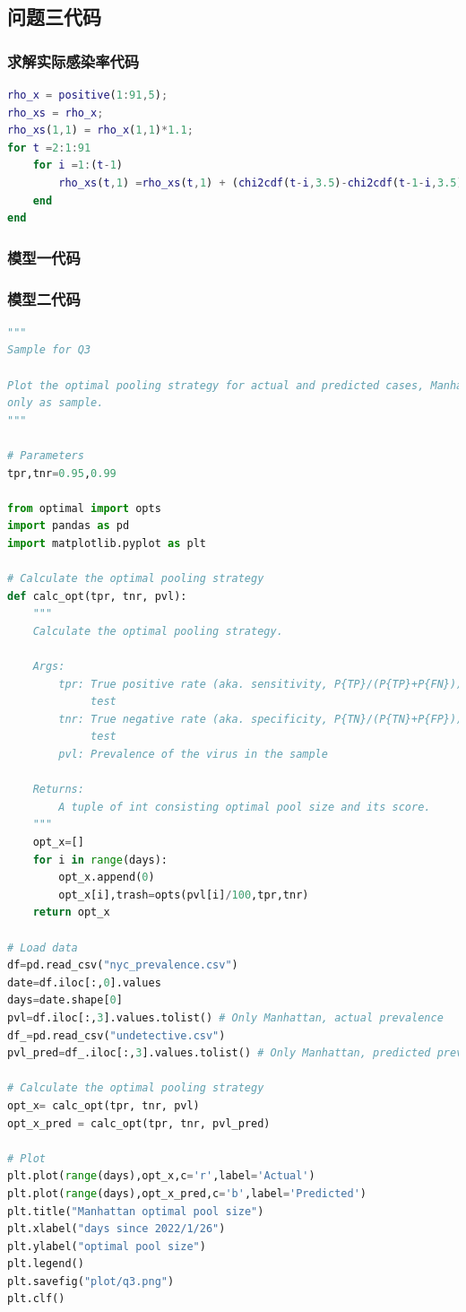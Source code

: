 \documentclass[withoutpreface,bwprint]{cumcmthesis} %
\begin{document}
\begin{appendices}
\subsection{问题三代码}
\subsubsection{求解实际感染率代码}
\begin{lstlisting}[language=matlab]
rho_x = positive(1:91,5);
rho_xs = rho_x;
rho_xs(1,1) = rho_x(1,1)*1.1;
for t =2:1:91
    for i =1:(t-1)
        rho_xs(t,1) =rho_xs(t,1) + (chi2cdf(t-i,3.5)-chi2cdf(t-1-i,3.5))*(rho_xs(i,1) - rho_x(i,1));
    end
end
\end{lstlisting}
\subsubsection{模型一代码}

\subsubsection{模型二代码}
\begin{lstlisting}[language=python]
"""
Sample for Q3

Plot the optimal pooling strategy for actual and predicted cases, Manhattan
only as sample.
"""

# Parameters
tpr,tnr=0.95,0.99

from optimal import opts
import pandas as pd
import matplotlib.pyplot as plt

# Calculate the optimal pooling strategy
def calc_opt(tpr, tnr, pvl):
    """
    Calculate the optimal pooling strategy.

    Args:
        tpr: True positive rate (aka. sensitivity, P{TP}/(P{TP}+P{FN})) of the
             test
        tnr: True negative rate (aka. specificity, P{TN}/(P{TN}+P{FP})) of the
             test
        pvl: Prevalence of the virus in the sample

    Returns:
        A tuple of int consisting optimal pool size and its score.
    """
    opt_x=[]
    for i in range(days):
        opt_x.append(0)
        opt_x[i],trash=opts(pvl[i]/100,tpr,tnr)
    return opt_x

# Load data
df=pd.read_csv("nyc_prevalence.csv")
date=df.iloc[:,0].values
days=date.shape[0]
pvl=df.iloc[:,3].values.tolist() # Only Manhattan, actual prevalence
df_=pd.read_csv("undetective.csv")
pvl_pred=df_.iloc[:,3].values.tolist() # Only Manhattan, predicted prevalence

# Calculate the optimal pooling strategy
opt_x= calc_opt(tpr, tnr, pvl)
opt_x_pred = calc_opt(tpr, tnr, pvl_pred)

# Plot
plt.plot(range(days),opt_x,c='r',label='Actual')
plt.plot(range(days),opt_x_pred,c='b',label='Predicted')
plt.title("Manhattan optimal pool size")
plt.xlabel("days since 2022/1/26")
plt.ylabel("optimal pool size")
plt.legend()
plt.savefig("plot/q3.png")
plt.clf()
\end{lstlisting}
\end{appendices}
\end{document}
